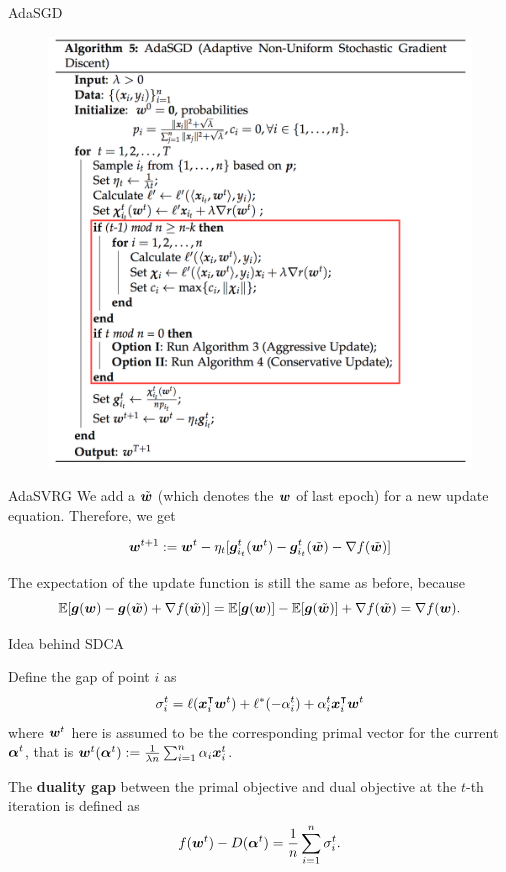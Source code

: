 \begin{frame}{AdaSGD}
\begin{figure}[H]
        \includegraphics[height=0.8\textheight]{images/AdaSGD.png} 
    \label{fig:AdaSGD}
\end{figure}
\end{frame}

\begin{frame}{AdaSVRG}
We add a $\tilde{\bm{w}}$ (which denotes the $\bm{w}$ of last epoch) for a new update equation. Therefore, we get

\begin{equation*}\label{eq:vr_w_update}
    \bm{w}^{t+1} := \bm{w}^{t}-\eta_t [\bm{g}_{i_t}^t(\bm{w}^{t}) - \bm{g}_{i_t}^t(\tilde{\bm{w}}) - \nabla f(\tilde{\bm{w}})]
\end{equation*}

The expectation of the update function is still the same as before, because
\[
    \mathbb{E}[\bm{g}(\bm{w}) - \bm{g}(\tilde{\bm{w}}) + \nabla f(\tilde{\bm{w}})] = \mathbb{E}[\bm{g}(\bm{w})] - \mathbb{E}[\bm{g}(\tilde{\bm{w}})] + \nabla f(\tilde{\bm{w}}) = \nabla f(\bm{w}).
\]
\end{frame}

\begin{frame}{Idea behind SDCA}
\begin{definition}{Define the gap of point $i$ as} 
\[
\sigma_i^t =  \ell(\bm{x}_i^\intercal\bm{w}^{t})+\ell^*(-\alpha_i^{t})+\alpha_i^{t}\bm{x}_i^\intercal\bm{w}^{t} 
\]
where $\bm{w}^t$ here is assumed to be the corresponding primal vector for the current $\bm{\alpha}^t$, that is $\bm{w}^t(\bm{\alpha}^t) := \frac{1}{\lambda n}\sum_{i=1}^n \alpha_i \bm{x}_i^t$.
\end{definition}

The \textbf{duality gap} between the primal objective and dual objective at the $t$-th iteration is defined as
\[
    f(\bm{w}^{t})-D(\bm{\alpha}^{t}) = \frac{1}{n} \sum_{i=1}^n \sigma_i^t.
\]
\end{frame}

